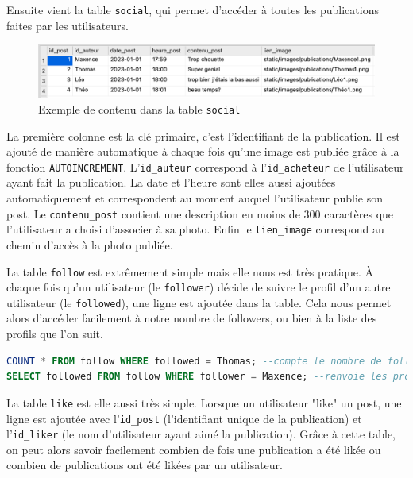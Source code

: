 \documentclass[11pt]{article}
\begin{document}
 Ensuite vient la table \texttt{social}, qui permet d'accéder à toutes les publications faites par les utilisateurs.
 
 \begin{figure}[h]
     \centering
     \includegraphics[scale=0.6]{SocialBDExemple.png}
     \caption{Exemple de contenu dans la table \texttt{social}}
 \end{figure}

La première colonne est la clé primaire, c'est l'identifiant de la publication. Il est ajouté de manière automatique à chaque fois qu'une image est publiée grâce à la fonction \texttt{AUTOINCREMENT}. L'\texttt{id\_auteur} correspond à l'\texttt{id\_acheteur} de l'utilisateur ayant fait la publication. La date et l'heure sont elles aussi ajoutées automatiquement et correspondent au moment auquel l'utilisateur publie son post. Le \texttt{contenu\_post} contient une description en moins de 300 caractères que l'utilisateur a choisi d'associer à sa photo. Enfin le \texttt{lien\_image} correspond au chemin d'accès à la photo publiée.
\vspace{0.4cm}

La table \texttt{follow} est extrêmement simple mais elle nous est très pratique. À chaque fois qu'un utilisateur (le \texttt{follower}) décide de suivre le profil d'un autre utilisateur (le \texttt{followed}), une ligne est ajoutée dans la table. Cela nous permet alors d'accéder facilement à notre nombre de followers, ou bien à la liste des profils que l'on suit.

\begin{lstlisting}[language=SQL, caption={Exemple de requete SQL sur la table \texttt{follow}}]
COUNT * FROM follow WHERE followed = Thomas; --compte le nombre de followers de Thomas
SELECT followed FROM follow WHERE follower = Maxence; --renvoie les profils suivie par Maxence
\end{lstlisting}
\vspace{0.4cm}

La table \texttt{like} est elle aussi très simple. Lorsque un utilisateur "like" un post, une ligne est ajoutée avec l'\texttt{id\_post} (l'identifiant unique de la publication) et l'\texttt{id\_liker} (le nom d'utilisateur ayant aimé la publication). Grâce à cette table, on peut alors savoir facilement combien de fois une publication a été likée ou combien de publications ont été likées par un utilisateur.
\end{document}
